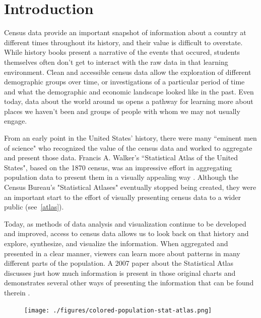 \documentclass[DIV=calc, paper=a4, fontsize=10pt, twocolumn]{scrartcl}\usepackage[]{graphicx}\usepackage[]{color}
\begin{document}
\section*{Introduction}

Census data provide an important snapshot of information about a country at different times throughout its history, and their value is difficult to overstate.  While history books present a narrative of the events that occured, students themselves often don't get to interact with the raw data in that learning environment. Clean and accessible census data allow the exploration of different demographic groups over time, or investigations of a particular period of time and what the demographic and economic landscape looked like in the past. Even today, data about the world around us opens a pathway for learning more about places we haven't been and groups of people with whom we may not usually engage.  


\par From an early point in the United States' history, there were many ``eminent men of science" who recognized the value of the census data and worked to aggregate and present those data. Francis A. Walker's ``Statistical Atlas of the United States", based on the 1870 census, was an impressive effort in aggregating population data to present them in a visually appealing way \citep{StatisticalAtlas}. Although the Census Bureau's "Statistical Atlases" eventually stopped being created, they were an important start to the effort of visually presenting census data to a wider public (see~\autoref{atlas}).


\par Today, as methods of data analysis and visualization continue to be developed and improved, access to census data allows us to look back on that history and explore, synthesize, and visualize the information. When aggregated and presented in a clear manner, viewers can learn more about patterns in many different parts of the population. A 2007 paper about the Statistical Atlas discusses just how much information is present in those original charts and demonstrates several other ways of presenting the information that can be found therein \citep{ChartInterview}.  

\begin{figure}[hbtp]
\centering
\texttt{[image: ./figures/colored-population-stat-atlas.png]}  
\label{atlas}
\end{figure}
\end{document}
